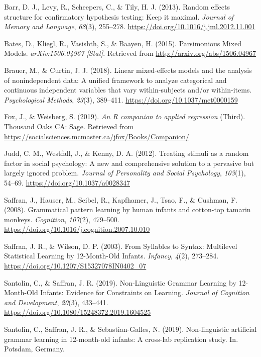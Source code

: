 \documentclass[
  english,
  man,man,floatsintext]{apa6}
\begin{document}
\begin{appendix}
\begingroup
\setlength{\parindent}{-0.5in}
\setlength{\leftskip}{0.5in}

\hypertarget{refs}{}
\leavevmode\hypertarget{ref-barr2013}{}%
Barr, D. J., Levy, R., Scheepers, C., \& Tily, H. J. (2013). Random
effects structure for confirmatory hypothesis testing: Keep it maximal.
\emph{Journal of Memory and Language}, \emph{68}(3), 255--278.
\url{https://doi.org/10.1016/j.jml.2012.11.001}

\leavevmode\hypertarget{ref-bates2015a}{}%
Bates, D., Kliegl, R., Vasishth, S., \& Baayen, H. (2015). Parsimonious
Mixed Models. \emph{arXiv:1506.04967 {[}Stat{]}}. Retrieved from
\url{http://arxiv.org/abs/1506.04967}

\leavevmode\hypertarget{ref-brauer2018}{}%
Brauer, M., \& Curtin, J. J. (2018). Linear mixed-effects models and the
analysis of nonindependent data: A unified framework to analyze
categorical and continuous independent variables that vary
within-subjects and/or within-items. \emph{Psychological Methods},
\emph{23}(3), 389--411. \url{https://doi.org/10.1037/met0000159}

\leavevmode\hypertarget{ref-fox2019}{}%
Fox, J., \& Weisberg, S. (2019). \emph{An R companion to applied
regression} (Third). Thousand Oaks CA: Sage. Retrieved from
\url{https://socialsciences.mcmaster.ca/jfox/Books/Companion/}

\leavevmode\hypertarget{ref-judd2012}{}%
Judd, C. M., Westfall, J., \& Kenny, D. A. (2012). Treating stimuli as a
random factor in social psychology: A new and comprehensive solution to
a pervasive but largely ignored problem. \emph{Journal of Personality
and Social Psychology}, \emph{103}(1), 54--69.
\url{https://doi.org/10.1037/a0028347}

\leavevmode\hypertarget{ref-saffran2008}{}%
Saffran, J., Hauser, M., Seibel, R., Kapfhamer, J., Tsao, F., \&
Cushman, F. (2008). Grammatical pattern learning by human infants and
cotton-top tamarin monkeys. \emph{Cognition}, \emph{107}(2), 479--500.
\url{https://doi.org/10.1016/j.cognition.2007.10.010}

\leavevmode\hypertarget{ref-saffran2003}{}%
Saffran, J. R., \& Wilson, D. P. (2003). From Syllables to Syntax:
Multilevel Statistical Learning by 12-Month-Old Infants. \emph{Infancy},
\emph{4}(2), 273--284. \url{https://doi.org/10.1207/S15327078IN0402_07}

\leavevmode\hypertarget{ref-santolin2019}{}%
Santolin, C., \& Saffran, J. R. (2019). Non-Linguistic Grammar Learning
by 12-Month-Old Infants: Evidence for Constraints on Learning.
\emph{Journal of Cognition and Development}, \emph{20}(3), 433--441.
\url{https://doi.org/10.1080/15248372.2019.1604525}

\leavevmode\hypertarget{ref-santolin2019a}{}%
Santolin, C., Saffran, J. R., \& Sebastian-Galles, N. (2019).
Non-linguistic artificial grammar learning in 12-month-old infants: A
cross-lab replication study. In. Potsdam, Germany.

\endgroup
\end{appendix}
\end{document}
